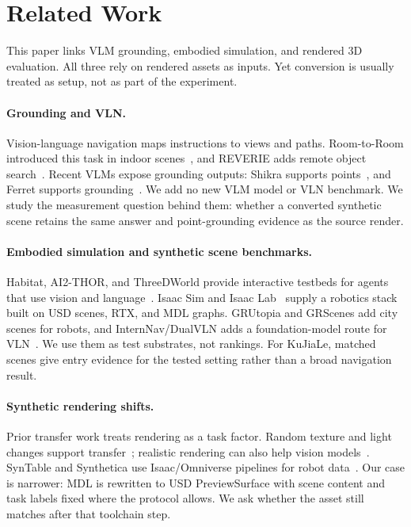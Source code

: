 \section{Related Work}
\label{sec:related_work}

This paper links VLM grounding, embodied simulation, and rendered 3D
evaluation. All three rely on rendered assets as inputs. Yet conversion is
usually treated as setup, not as part of the experiment.

\paragraph{Grounding and VLN.}
Vision-language navigation maps instructions to views and paths.
Room-to-Room introduced this task in indoor scenes~\cite{Anderson2018Vision},
and REVERIE adds remote object
search~\cite{Qi2020REVERIE}. Recent VLMs expose grounding outputs:
Shikra supports points~\cite{Chen2023Shikra}, and Ferret
supports grounding~\cite{You2024Ferret}. We add
no new VLM model or VLN benchmark. We study the measurement
question behind them: whether a converted synthetic scene retains the same
answer and point-grounding evidence as the source render.

\paragraph{Embodied simulation and synthetic scene benchmarks.}
Habitat, \mbox{AI2-THOR}, and ThreeDWorld provide interactive testbeds for
agents that use vision and language~\cite{Savva2019Habitat,Kolve2017AI2THOR,Gan2021ThreeDWorld}.
Isaac Sim and Isaac Lab~\cite{Mittal2023Orbit,Mittal2025Isaac} supply a
robotics stack built on USD scenes, RTX, and MDL graphs. \mbox{GRUtopia} and
GRScenes add city scenes for robots, and \mbox{InternNav/DualVLN} adds a
foundation-model route for VLN~\cite{Wang2024GRUtopia,Wei2026Ground}. We use
them as test substrates, not rankings. For KuJiaLe, matched scenes give entry
evidence for the tested setting rather than a broad navigation result.

\paragraph{Synthetic rendering shifts.}
{\relax
Prior transfer work treats rendering as a task factor. Random texture and
light changes support transfer~\cite{Tobin2017Domain,Tremblay2018Training};
realistic rendering can also help vision models~\cite{Zakharov2022Photo}.
SynTable and Synthetica use Isaac/Omniverse pipelines for robot
data~\cite{Ng2023SynTable,Singh2025Synthetica}. Our case is narrower: MDL is
rewritten to USD PreviewSurface with scene content and task labels fixed where
the protocol allows. We ask whether the asset still matches after that
toolchain step.\par}

